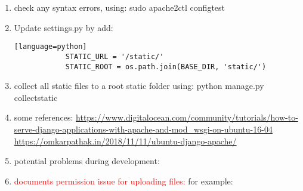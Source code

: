 \documentclass[UTF8,fancyhdr,a4paper]{ctexart}
\begin{document}
\begin{enumerate}
\begin{verbatim}
ServerAdmin webmaster@localhost
DocumentRoot /var/www/html

<Directory /home/pi/Desktop/website_venv/WebsiteProject/django_project>
    <Files wsgi.py>
    Require all granted
    </Files>
</Directory>

WSGIDaemonProcess mysite python-path=/home/pi/Desktop/website_venv/WebsiteProject python-home=/home/pi/Desktop/website_venv
WSGIProcessGroup mysite
WSGIScriptAlias / /home/pi/Desktop/website_venv/WebsiteProject/django_project/wsgi.py

Alias /static /home/pi/Desktop/website_venv/WebsiteProject/static
<Directory /home/pi/Desktop/website_venv/WebsiteProject/static>
Require all granted
</Directory>

Alias /media /home/pi/Desktop/website_venv/WebsiteProject/media
<Directory /home/pi/Desktop/website_venv/WebsiteProject/media>
Require all granted
</Directory>
\end{verbatim}
      \item check any syntax errors, using: sudo apache2ctl configtest
      \item Update settings.py by add:
            \begin{verbatim}[language=python]
            STATIC_URL = '/static/'
            STATIC_ROOT = os.path.join(BASE_DIR, 'static/')
        \end{verbatim}
      \item collect all static files to a root static folder using: python manage.py collectstatic
      \item some references: \url{https://www.digitalocean.com/community/tutorials/how-to-serve-django-applications-with-apache-and-mod_wsgi-on-ubuntu-16-04} \url{https://omkarpathak.in/2018/11/11/ubuntu-django-apache/}
      \item potential problems during development:
      \item \textcolor{red}{documents permission issue for uploading files:} for example:


\end{enumerate}
\end{document}
